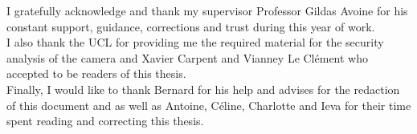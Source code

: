 \vspace{5cm}

I gratefully acknowledge and thank my supervisor Professor Gildas Avoine for his constant support, guidance, corrections and trust during this year of work.\\

I also thank the UCL for providing me the required material for the security analysis of the camera and Xavier Carpent and Vianney Le Clément who accepted to be readers of this thesis.\\

Finally, I would like to thank Bernard for his help and advises for the redaction of this document and as well as Antoine, Céline, Charlotte and Ieva for their time spent reading and correcting this thesis.

